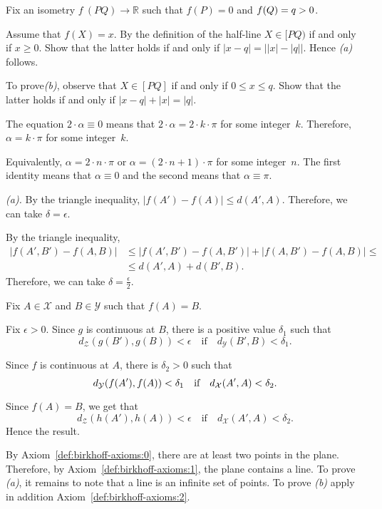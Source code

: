 Fix an isometry $f\:(P Q)\to \mathbb{R}$ such that $f(P)=0$ and $f(Q)\z=q>0$.

Assume that $f(X)=x$.
By the definition of the half-line $X\in[PQ)$ if and only if $x\ge 0$.
Show that the latter holds if and only if 
$|x-q|=\bigl||x|-|q|\bigr|$.
Hence \textit{(a)} follows.

To prove\textit{(b)}, observe that $X\in [PQ]$ if and only if $0\le x\le q$.
Show that the latter holds if and only if 
$|x-q|+|x|=|q|$.

The equation
$2\cdot\alpha\equiv 0$
means that $2\cdot\alpha=2\cdot k\cdot\pi$ for some integer~$k$.
Therefore,
$\alpha=k\cdot\pi$ for some integer~$k$.

Equivalently, $\alpha=2\cdot n\cdot \pi$ or $\alpha=(2\cdot n+1)\cdot \pi$ for some integer~$n$.
The first identity means that $\alpha\equiv 0$ and the second means that $\alpha\equiv \pi$.

 \textit{(a).}
By the triangle inequality,
$|f(A')-f(A)|\le d(A',A)$.
Therefore, we can take $\delta=\epsilon$.

By the triangle inequality,
\begin{align*}
|f(A',B')-f(A,B)|
&\le |f(A',B')-f(A,B')|
+|f(A,B')-f(A,B)|
\le
\\
&\le d(A',A)+d(B',B).
\end{align*}
Therefore, we can take $\delta=\tfrac\epsilon2$.

Fix $A\in \mathcal{X}$ and $B\in\mathcal{Y}$
such that $f(A)=B$.

Fix $\epsilon>0$.
Since $g$ is continuous at $B$, there is a positive value $\delta_1$ such that 
$$d_{\mathcal{Z}}(g(B'),g(B))<\epsilon
\quad
\text{if}
\quad
d_{\mathcal{Y}}(B',B)<\delta_1.$$ 

Since $f$ is continuous at $A$, there is $\delta_2>0$ such that 
$$d_{\mathcal{Y}}(f(A'),f(A))\z<\delta_1
\quad
\text{if}
\quad
d_{\mathcal{X}}(A',A)<\delta_2.$$ 

Since $f(A)=B$, we get that
$$d_{\mathcal{Z}}(h(A'),h(A))<\epsilon
\quad
\text{if}
\quad
d_{\mathcal{X}}(A',A)<\delta_2.$$ 
Hence the result.

\setcounter{eqtn}{0}

 By Axiom~\ref{def:birkhoff-axioms:0}, there are at least two points in the plane.
Therefore, by Axiom~\ref{def:birkhoff-axioms:1}, 
the plane contains a line. 
To prove \textit{(a)}, it remains to note that a line is an infinite set of points.
To prove \textit{(b)} apply in addition Axiom~\ref{def:birkhoff-axioms:2}.

